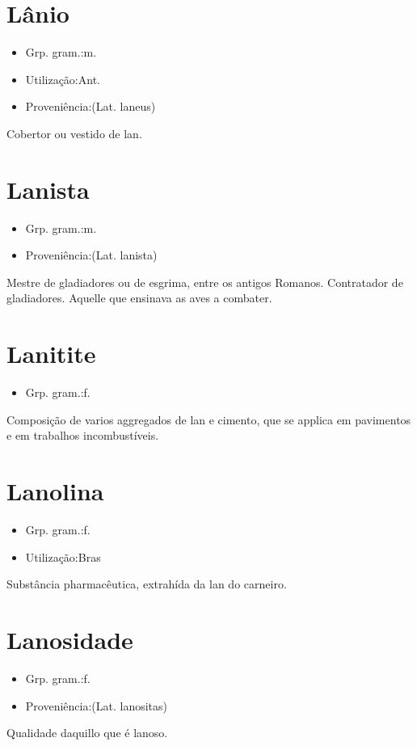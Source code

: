\section{Lânio}
\begin{itemize}
\item {Grp. gram.:m.}
\end{itemize}
\begin{itemize}
\item {Utilização:Ant.}
\end{itemize}
\begin{itemize}
\item {Proveniência:(Lat. \textunderscore laneus\textunderscore )}
\end{itemize}
Cobertor ou vestido de lan.
\section{Lanista}
\begin{itemize}
\item {Grp. gram.:m.}
\end{itemize}
\begin{itemize}
\item {Proveniência:(Lat. \textunderscore lanista\textunderscore )}
\end{itemize}
Mestre de gladiadores ou de esgrima, entre os antigos Romanos.
Contratador de gladiadores.
Aquelle que ensinava as aves a combater.
\section{Lanitite}
\begin{itemize}
\item {Grp. gram.:f.}
\end{itemize}
Composição de varios aggregados de lan e cimento, que se applica em pavimentos e em trabalhos incombustíveis.
\section{Lanolina}
\begin{itemize}
\item {Grp. gram.:f.}
\end{itemize}
\begin{itemize}
\item {Utilização:Bras}
\end{itemize}
Substância pharmacêutica, extrahída da lan do carneiro.
\section{Lanosidade}
\begin{itemize}
\item {Grp. gram.:f.}
\end{itemize}
\begin{itemize}
\item {Proveniência:(Lat. \textunderscore lanositas\textunderscore )}
\end{itemize}
Qualidade daquillo que é lanoso.
